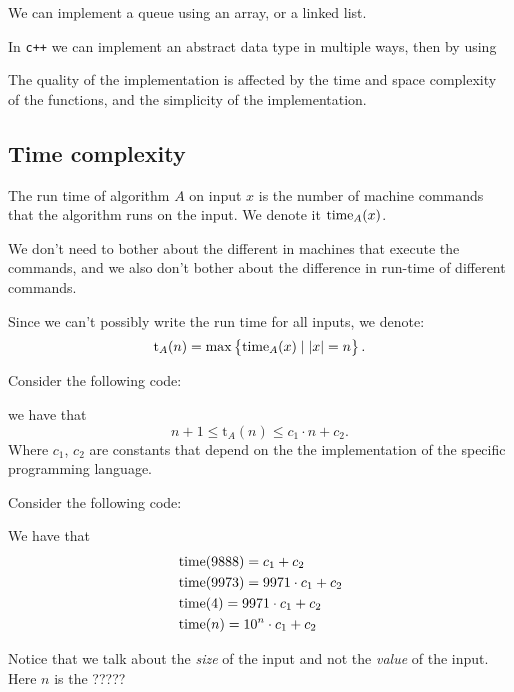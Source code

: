 \documentclass[11pt,a4paper]{article}
\begin{document}
We can implement a queue using an array, or a linked list.

In \texttt{c++} we can implement an abstract data type in multiple ways, then
by using

The quality of the implementation is affected by the time and space complexity
of the functions, and the simplicity of the implementation.

\subsection{Time complexity}

\begin{definition}
    The run time of algorithm $A$ on input $x$ is the number of machine
    commands that the algorithm runs on the input.
    We denote it $\operatorname{time}_A(x)$.
\end{definition}
\begin{remark}
    We don't need to bother about the different in machines that execute
    the commands, and we also don't bother about the difference in run-time
    of different commands.
\end{remark}

Since we can't possibly write the run time for all inputs, we denote:
\[
    \mathrm t_A(n) = \max\set{\operatorname{time}_A(x) \mid |x| = n}.
\]

\begin{example}
    Consider the following code:

    we have that
    \[
        n + 1 \le \mathrm t_A(n) \le c_1 \cdot n + c_2.
    \]
    Where $c_1$, $c_2$ are constants that depend on the the implementation
    of the specific programming language.
\end{example}

\begin{example}
    Consider the following code:

    We have that
    \begin{align*}
        &\operatorname{time}(9888) = c_1 + c_2 \\
        &\operatorname{time}(9973) = 9971 \cdot c_1 + c_2 \\
        &\operatorname{time}(4) = 9971 \cdot c_1 + c_2 \\
        &\operatorname{time}(n) = 10^n \cdot c_1 + c_2
    \end{align*}
\end{example}
\begin{remark}
    Notice that we talk about the \emph{size} of the input and not the 
    \emph{value} of the input.
    Here $n$ is the ?????
\end{remark}
\end{document}
